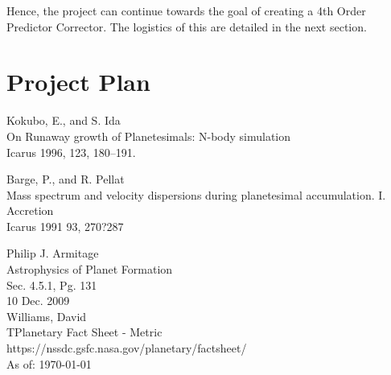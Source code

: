 \documentclass[a4paper,10pt]{article}
\begin{document}
Hence, the project can continue towards the goal of creating a 4th Order Predictor Corrector. The logistics of this are detailed in the next section.

\section{Project Plan}


\begin{thebibliography}{9}

Kokubo, E., and S. Ida\\
On Runaway growth of Planetesimals: N-body simulation\\ 
Icarus 1996, 123, 180--191.

Barge, P., and R. Pellat\\ 
Mass spectrum and velocity dispersions during planetesimal accumulation. I. Accretion\\
Icarus 1991 93, 270?287

Philip J. Armitage\\
Astrophysics of Planet Formation\\
Sec. 4.5.1, Pg. 131\\
10 Dec. 2009\\

Williams, David\\
TPlanetary Fact Sheet - Metric\\
https://nssdc.gsfc.nasa.gov/planetary/factsheet/\\ As of: \today

\end{thebibliography}
\end{document}

